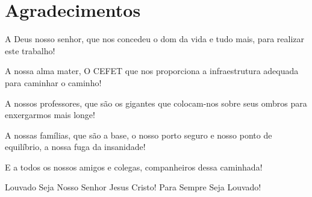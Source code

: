 

\chapter{Agradecimentos}\label{sec:agradecimentos}

A Deus nosso senhor, que nos concedeu o dom da vida e tudo mais, para realizar este trabalho!

A nossa alma mater, O CEFET que nos proporciona a infraestrutura adequada para caminhar o caminho!

A nossos professores, que são os gigantes que colocam-nos sobre seus ombros para enxergarmos mais longe!

A nossas famílias, que são a base, o nosso porto seguro e nosso ponto de equilíbrio, a nossa fuga da insanidade!

E a todos os nossos amigos e colegas, companheiros dessa caminhada!

Louvado Seja Nosso Senhor Jesus Cristo!
Para Sempre Seja Louvado!

